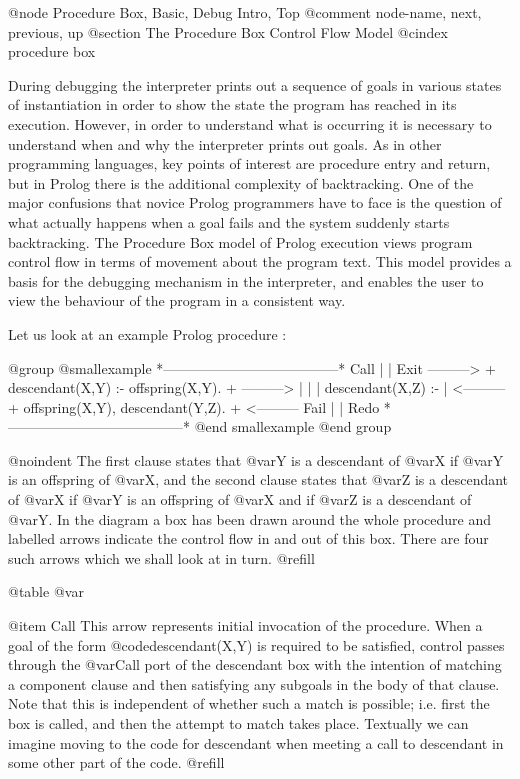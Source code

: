 @node Procedure Box, Basic, Debug Intro, Top
@comment  node-name,  next,  previous,  up
@section The Procedure Box Control Flow Model
@cindex procedure box

During debugging the interpreter prints out a sequence of goals in
various states of instantiation in order to show the state the program
has reached in its execution.  However, in order to understand what is
occurring it is necessary to understand when and why the interpreter
prints out goals.  As in other programming languages, key points of
interest are procedure entry and return, but in Prolog there is the
additional complexity of backtracking.  One of the major confusions that
novice Prolog programmers have to face is the question of what actually
happens when a goal fails and the system suddenly starts backtracking.
The Procedure Box model of Prolog execution views program control flow
in terms of movement about the program text.  This model provides a
basis for the debugging mechanism in the interpreter, and enables the
user to view the behaviour of the program in a consistent way.

Let us look at an example Prolog procedure :

@group
@smallexample
           *--------------------------------------*
   Call    |                                      |    Exit
---------> +  descendant(X,Y) :- offspring(X,Y).  + --------->
           |                                      |
           |  descendant(X,Z) :-                  |
<--------- +     offspring(X,Y), descendant(Y,Z). + <---------
   Fail    |                                      |    Redo
           *--------------------------------------*
@end smallexample
@end group

@noindent
The first clause states that @var{Y} is a descendant of @var{X} if
@var{Y} is an offspring of @var{X}, and the second clause states that
@var{Z} is a descendant of @var{X} if @var{Y} is an offspring of @var{X}
and if @var{Z} is a descendant of @var{Y}.  In the diagram a box has been
drawn around the whole procedure and labelled arrows indicate the
control flow in and out of this box.  There are four such arrows which
we shall look at in turn. @refill

@table @var

@item Call
This arrow represents initial invocation of the procedure.  When a goal
of the form @code{descendant(X,Y)} is required to be satisfied, control
passes through the @var{Call} port of the descendant box with the
intention of matching a component clause and then satisfying any
subgoals in the body of that clause.  Note that this is independent of
whether such a match is possible; i.e. first the box is called, and then
the attempt to match takes place.  Textually we can imagine moving to
the code for descendant when meeting a call to descendant in some other
part of the code. @refill

